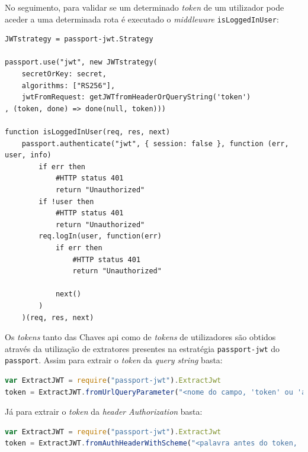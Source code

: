No seguimento, para validar se um determinado \textit{token} de um utilizador pode aceder a uma determinada rota é executado o \textit{middleware} \texttt{isLoggedInUser}:
\begin{lstlisting}[language=pseudocode, caption=Verificação se um pedido com um determinado \textit{token} de um utilizador registado pode ser efetuado]
JWTstrategy = passport-jwt.Strategy

passport.use("jwt", new JWTstrategy(
    secretOrKey: secret,
    algorithms: ["RS256"],
    jwtFromRequest: getJWTfromHeaderOrQueryString('token')
, (token, done) => done(null, token)))

function isLoggedInUser(req, res, next)
    passport.authenticate("jwt", { session: false }, function (err, user, info)
        if err then
            #HTTP status 401
            return "Unauthorized"
        if !user then
            #HTTP status 401
            return "Unauthorized"
        req.logIn(user, function(err)
            if err then
                #HTTP status 401
                return "Unauthorized"

            next()
        )
    )(req, res, next)
\end{lstlisting}

Os \textit{tokens} tanto das Chaves \acrshort{api} como de \textit{tokens} de utilizadores são obtidos através da utilização de extratores presentes na estratégia \texttt{passport-jwt} do \texttt{passport}. Assim para extrair o \textit{token} da \textit{query string} basta:
\begin{lstlisting}[language=javascript, caption=Extração do \textit{token} da \textit{query string}]
var ExtractJWT = require("passport-jwt").ExtractJwt
token = ExtractJWT.fromUrlQueryParameter("<nome do campo, 'token' ou 'apikey' no caso da CLAV>")
\end{lstlisting}
Já para extrair o \textit{token} da \textit{header} \textit{Authorization} basta:
\begin{lstlisting}[language=javascript, caption=Extração do \textit{token} da \textit{header} \textit{Authorization}]
var ExtractJWT = require("passport-jwt").ExtractJwt
token = ExtractJWT.fromAuthHeaderWithScheme("<palavra antes do token, 'Bearer' no caso dum bearer token, 'token' ou 'apikey' no caso da CLAV>")
\end{lstlisting}

